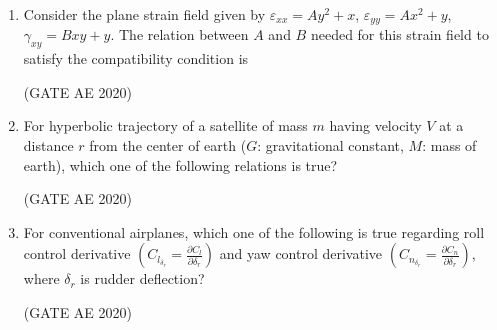 \documentclass[journal,12pt,onecolumn]{IEEEtran}
\theoremstyle{remark}
\begin{document}
\begin{enumerate}
\item Consider the plane strain field given by $\varepsilon_{xx} = Ay^2 + x$, $\varepsilon_{yy} = Ax^2 + y$, $\gamma_{xy} = B x y + y$. The relation between $A$ and $B$ needed for this strain field to satisfy the compatibility condition is
    \begin{enumerate}
    \end{enumerate}
    \hfill(GATE AE 2020)

\item For hyperbolic trajectory of a satellite of mass $m$ having velocity $V$ at a distance $r$ from the center of earth ($G$: gravitational constant, $M$: mass of earth), which one of the following relations is true?
    \begin{enumerate}
    \end{enumerate}
    \hfill(GATE AE 2020)

\item For conventional airplanes, which one of the following is true regarding roll control derivative $\left( C_{l_{\delta_r}} = \frac{\partial C_l}{\partial \delta_r} \right)$ and yaw control derivative $\left( C_{n_{\delta_r}} = \frac{\partial C_n}{\partial \delta_r} \right)$, where $\delta_r$ is rudder deflection?
\begin{enumerate}
\end{enumerate}
\hfill(GATE AE 2020)


\end{enumerate}
\end{document}
